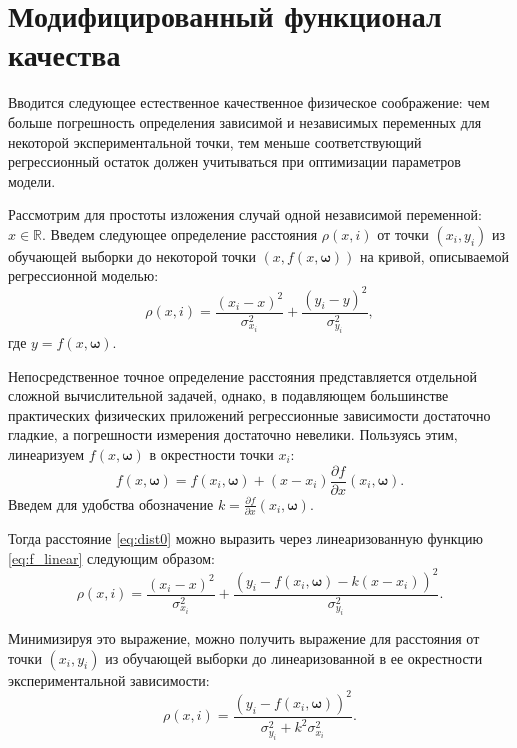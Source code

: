 \documentclass[11pt,a4paper]{article}
\newcommand{\bomega}{\boldsymbol{\omega}}
\begin{document}
\section{Модифицированный функционал качества}

Вводится следующее естественное качественное физическое соображение:
чем больше погрешность определения зависимой и независимых переменных
для некоторой экспериментальной точки, тем меньше соответствующий
регрессионный остаток должен учитываться при оптимизации параметров модели.

Рассмотрим для простоты изложения случай одной независимой переменной:
$x \in \mathbb{R}$. Введем следующее определение расстояния $\rho(x, i)$
от точки $(x_i, y_i)$ из обучающей выборки до некоторой точки
$(x, f(x, \bomega))$ на кривой, описываемой регрессионной моделью:
\begin{equation}
  \rho(x, i) = \frac{(x_i - x)^2}{\sigma_{x_i}^2} + \frac{(y_i - y)^2}{\sigma_{y_i}^2},
  \label{eq:dist0}
\end{equation}
где $y = f(x, \bomega)$.

Непосредственное точное определение расстояния представляется отдельной
сложной вычислительной задачей, однако, в подавляющем большинстве
практических физических приложений регрессионные зависимости достаточно
гладкие, а погрешности измерения достаточно невелики. Пользуясь этим,
линеаризуем $f(x, \bomega)$ в окрестности точки $x_i$:
\begin{equation}
  f(x, \bomega) = f(x_i, \bomega) + (x - x_i) \frac{\partial f}{\partial x}(x_i, \bomega).
  \label{eq:f_linear}
\end{equation}
Введем для удобства обозначение $k = \frac{\partial f}{\partial x}(x_i, \bomega)$.

Тогда расстояние \eqref{eq:dist0} можно выразить через линеаризованную функцию
\eqref{eq:f_linear} следующим образом:
\begin{equation}
  \rho(x, i) = \frac{(x_i - x)^2}{\sigma_{x_i}^2} + \frac{(y_i - f(x_i, \bomega) - k (x - x_i))^2}{\sigma_{y_i}^2}.
  \label{eq:dist_linear}
\end{equation}

Минимизируя это выражение, можно получить выражение для расстояния от
точки $(x_i, y_i)$ из обучающей выборки до линеаризованной в ее
окрестности экспериментальной зависимости:
\begin{equation}
  \rho(x, i) = \frac{(y_i - f(x_i, \bomega))^2}{\sigma^2_{y_i} + k^2 \sigma^2_{x_i}}.
  \label{eq:rho_univar}
\end{equation}
\end{document}
